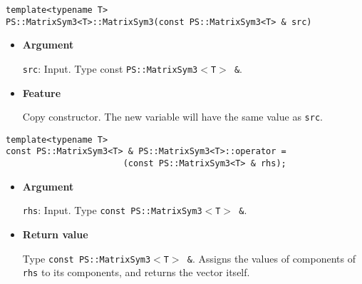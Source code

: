 
\begin{screen}
\begin{verbatim}
template<typename T>
PS::MatrixSym3<T>::MatrixSym3(const PS::MatrixSym3<T> & src)
\end{verbatim}
\end{screen}

\begin{itemize}

\item{{\bf Argument}}

\texttt{src}: Input. Type const \texttt{PS::MatrixSym3$<$T$>$ \&}.

\item{{\bf Feature}}

Copy constructor. The new variable will have the same value as \texttt{src}.

\end{itemize}


\begin{screen}
\begin{verbatim}
template<typename T>
const PS::MatrixSym3<T> & PS::MatrixSym3<T>::operator = 
                       (const PS::MatrixSym3<T> & rhs);
\end{verbatim}
\end{screen}

\begin{itemize}

\item{{\bf Argument}}

\texttt{rhs}: Input. Type \texttt{const PS::MatrixSym3$<$T$>$ \&}.

\item{{\bf Return value}}

Type \texttt{const PS::MatrixSym3$<$T$>$ \&}. Assigns the values of components of \texttt{rhs}
to its components, and returns the vector itself.

\end{itemize}


